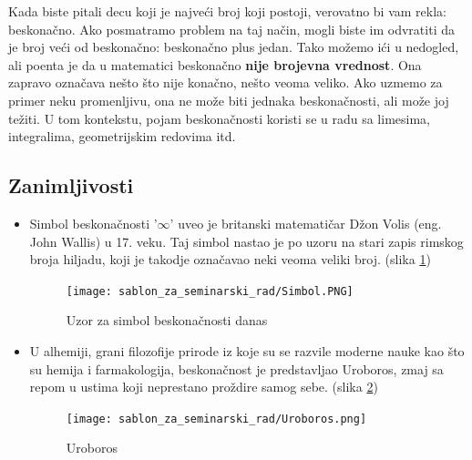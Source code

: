 \documentclass[a4paper]{article}
\begin{document}
Kada biste pitali decu koji je najveći broj koji postoji, verovatno bi vam rekla: beskonačno. Ako posmatramo problem na taj način, mogli biste im odvratiti da je broj veći od beskonačno: beskonačno plus jedan. Tako možemo ići u nedogled, ali poenta je da u matematici beskonačno \textbf{nije brojevna vrednost}. Ona zapravo označava nešto što nije konačno, nešto veoma veliko. Ako uzmemo za primer neku promenljivu, ona ne može biti jednaka beskonačnosti, ali može joj težiti. U tom kontekstu, pojam beskonačnosti koristi se u radu sa limesima, integralima, geometrijskim redovima itd.\\


\subsection{Zanimljivosti}

\begin{itemize}
    \item Simbol beskonačnosti '$\infty$' uveo je britanski matematičar Džon Volis (eng. John Wallis) u 17. veku. Taj simbol nastao je po uzoru na stari zapis rimskog broja hiljadu, koji je takodje označavao neki veoma veliki broj. (slika \ref{fig:Uzor za simbol beskonačnosti danas})\cite{beskonačno2016}
    
    \begin{figure}[ht!]
    \begin{center}
    \texttt{[image: sablon\_za\_seminarski\_rad/Simbol.PNG]}
    \end{center}
    \caption{Uzor za simbol beskonačnosti danas}
    \label{fig:Uzor za simbol beskonačnosti danas}
    \end{figure}
    
    \item U alhemiji, grani filozofije prirode iz koje su se razvile moderne nauke kao što su hemija i farmakologija, beskonačnost je predstavljao Uroboros, zmaj sa repom u ustima koji neprestano proždire samog sebe. (slika \ref{fig:Uroboros})
    
    \begin{figure}[ht!]
    \begin{center}
    \texttt{[image: sablon\_za\_seminarski\_rad/Uroboros.png]}
    \end{center}
    \caption{Uroboros}
    \label{fig:Uroboros}
    \end{figure}
\end{itemize}

\newpage
\end{document}
